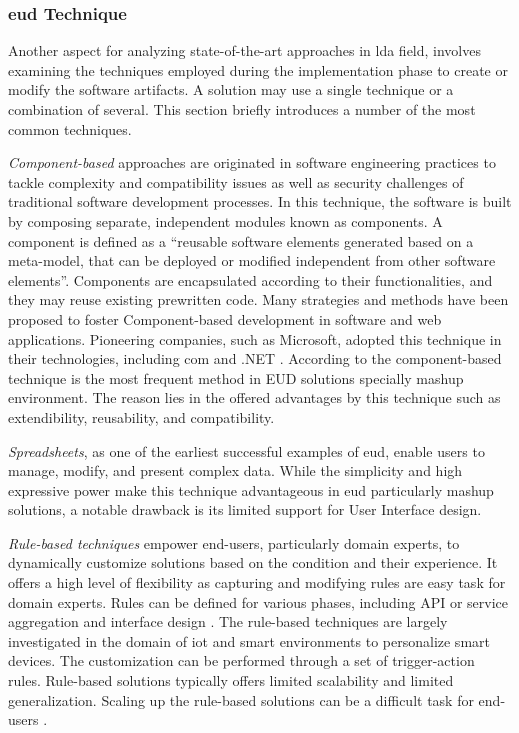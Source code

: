 \hypertarget{edu-technique}{%
\subsubsection*{\gls{eud} Technique}\label{edu-technique}}
Another aspect for analyzing state-of-the-art  approaches in \gls{lda} field, involves examining the techniques employed during the implementation phase to create or modify the software artifacts. A solution may use a single technique or a combination of several. This section briefly introduces a number of the most common techniques. 

\emph{Component-based} approaches are originated in software engineering practices to tackle complexity and compatibility issues as well as security challenges of traditional software development processes. In this technique, the software is built by composing separate, independent modules known as components. A component is defined as a “reusable software elements generated based on a meta-model, that can be deployed or modified independent from other software elements”. Components are encapsulated according to their functionalities, and they may reuse existing prewritten code. Many strategies and methods have been proposed to foster Component-based development in software and web applications. Pioneering companies, such as Microsoft, adopted this technique in their technologies, including \gls{com} and .NET \autocite{Tschudnowsky2016}.
According to \autocite{Barricelli2019} the component-based technique is the most frequent method in EUD solutions specially mashup environment. The reason lies in the offered advantages by this technique such as extendibility, reusability, and compatibility. 

\emph{Spreadsheets}, as one of the earliest successful examples of \gls{eud}, enable users to manage, modify, and present complex data. While the simplicity and high expressive power make this technique advantageous in \gls{eud} particularly mashup solutions, a notable drawback is its limited support for User Interface design.

\emph{Rule-based techniques} empower end-users, particularly domain experts, to dynamically customize solutions based on the condition and their experience. It offers a high level of flexibility as capturing and modifying rules are easy task for domain experts. Rules can be defined for various phases, including API or service aggregation and interface design \autocite{Pascalau2009}. The rule-based techniques are largely investigated in the domain of \gls{iot} and smart environments to personalize smart devices. The customization can be performed through a set of trigger-action rules. Rule-based solutions typically offers limited scalability and limited generalization. Scaling up the rule-based solutions can be a difficult task for end-users \autocite{Barricelli2019}.

